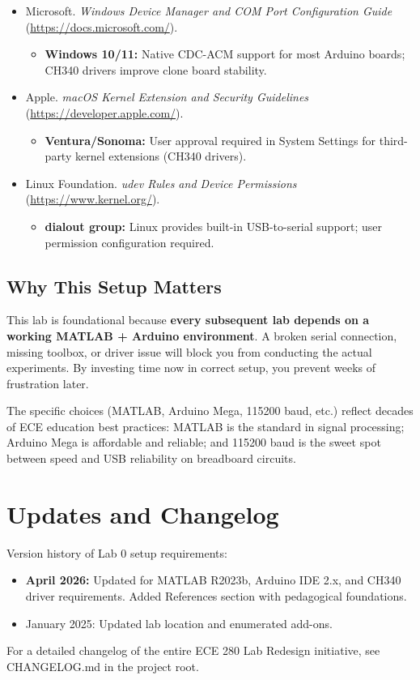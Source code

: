 \documentclass[12pt]{article}
\begin{document}
\begin{itemize}
    \item Microsoft. \textit{Windows Device Manager and COM Port Configuration Guide} (\url{https://docs.microsoft.com/}).
    \begin{itemize}
        \item \textbf{Windows 10/11:} Native CDC-ACM support for most Arduino boards; CH340 drivers improve clone board stability.
    \end{itemize}

    \item Apple. \textit{macOS Kernel Extension and Security Guidelines} (\url{https://developer.apple.com/}).
    \begin{itemize}
        \item \textbf{Ventura/Sonoma:} User approval required in System Settings for third-party kernel extensions (CH340 drivers).
    \end{itemize}

    \item Linux Foundation. \textit{udev Rules and Device Permissions} (\url{https://www.kernel.org/}).
    \begin{itemize}
        \item \textbf{dialout group:} Linux provides built-in USB-to-serial support; user permission configuration required.
    \end{itemize}
\end{itemize}

\subsection*{Why This Setup Matters}

This lab is foundational because \textbf{every subsequent lab depends on a working MATLAB + Arduino environment}. A broken serial connection, missing toolbox, or driver issue will block you from conducting the actual experiments. By investing time now in correct setup, you prevent weeks of frustration later.

The specific choices (MATLAB, Arduino Mega, 115200 baud, etc.) reflect decades of ECE education best practices: MATLAB is the standard in signal processing; Arduino Mega is affordable and reliable; and 115200 baud is the sweet spot between speed and USB reliability on breadboard circuits.

\section{Updates and Changelog}

Version history of Lab 0 setup requirements:
\begin{itemize}
\item \textbf{April 2026:} Updated for MATLAB R2023b, Arduino IDE 2.x, and CH340 driver requirements. Added References section with pedagogical foundations.
\item January 2025: Updated lab location and enumerated add-ons.
\end{itemize}

For a detailed changelog of the entire ECE 280 Lab Redesign initiative, see CHANGELOG.md in the project root.
\end{document}
